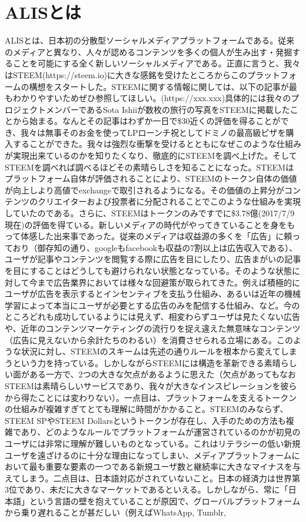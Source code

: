 \documentclass{jsarticle}
\begin{document}
\section{ALISとは}
ALISとは、日本初の分散型ソーシャルメディアプラットフォームである。従来のメディアと異なり、人々が認めるコンテンツを多くの個人が生み出す・発掘することを可能にする全く新しいソーシャルメディアである。正直に言うと、我々はSTEEM(https://steem.io)に大きな感銘を受けたところからこのプラットフォームの構想をスタートした。STEEMに関する情報に関しては、以下の記事が最もわかりやすいためぜひ参照してほしい。(https://xxx.xxx)具体的には我々のプロジェクトメンバーであるSota Ishiiが数枚の旅行の写真をSTEEMに掲載したことから始まる。なんとその記事はわずか一日で\$30近くの評価を得ることができ、我々は無事そのお金を使ってLPローンチ祝としてドミノの最高級ピザを購入することができた。我々は強烈な衝撃を受けるとともになぜこのような仕組みが実現出来ているのかを知りたくなり、徹底的にSTEEMを調べ上げた。そしてSTEEMを調べれば調べるほどその素晴らしさを知ることになった。STEEMはプラットフォーム自体が評価されることにより、STEEMのトークン自体の価値が向上しより高値でexchangeで取引されるようになる。その価値の上昇分がコンテンツのクリエイターおよび投票者に分配されることでこのような仕組みを実現していたのである。さらに、STEEMはトークンのみですでに\$3.78億(2017/7/9現在)の評価を得ている。新しいメディアの時代がやってきていることを身をもって体感した出来事であった。従来のメディアは収益源の多くを「広告」に頼っており（御存知の通り、googleもfacebookも収益の7割以上は広告収入である）、ユーザが記事やコンテンツを閲覧する際に広告を目にしたり、広告まがいの記事を目にすることはどうしても避けられない状態となっている。そのような状態に対して今まで広告業界においては様々な回避策が取られてきた。例えば積極的にユーザが広告を表示するとインセンティブを支払う仕組み、あるいは近年の機械学習によって本当にユーザが必要とする広告のみを配信する仕組み、など。今のところどれも成功しているようには見えず、相変わらずユーザは見たくない広告や、近年のコンテンツマーケティングの流行りを捉え違えた無意味なコンテンツ（広告に見えないから余計たちのわるい）を消費させられる立場にある。このような状況に対し、STEEMのスキームは先述の通りルールを根本から変えてしまうという力を持っている。しかしながらSTEEMには構造を革新できる素晴らしい面がある一方で、2つの大きな欠点があるように思えた（欠点があってもなおSTEEMは素晴らしいサービスであり、我々が大きなインスピレーションを彼らから得たことには変わりない）。一点目は、プラットフォームを支えるトークンの仕組みが複雑すぎてとても理解に時間がかかること。STEEMのみならず、STEEM SPやSTEEM Dollarsというトークンが存在し、入手のための方法も複雑であり、どのようなルールでプラットフォームが運営されているのかが初見のユーザには非常に理解が難しいものとなっている。これはリテラシーの低い新規ユーザを遠ざけるのに十分な理由になってしまい、メディアプラットフォームにおいて最も重要な要素の一つである新規ユーザ数と継続率に大きなマイナスを与えてしまう。二点目は、日本語対応がされていないこと。日本の経済力は世界第3位であり、未だに大きなマーケットであるといえる。しかしながら、常に「日本語」という言語の壁を抱えていることが原因で、グローバルプラットフォームから乗り遅れることが甚だしい（例えばWhatsApp, Tumblr, 
\end{document}
